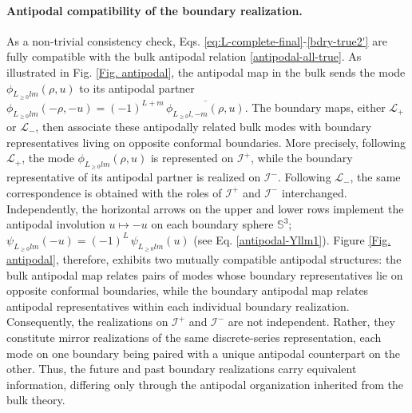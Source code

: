 \documentclass[aps,twocolumn,nofootinbib]{revtex4}
\begin{document}
{\paragraph{Antipodal compatibility of the boundary realization.} As a non-trivial consistency check, Eqs. \eqref{eq:L-complete-final}-\eqref{bdry-true2'} are fully compatible with the bulk antipodal relation \eqref{antipodal-all-true}. As illustrated in Fig. \ref{Fig. antipodal}, the antipodal map in the bulk sends the mode $\phi^{}_{L_{\geqslant 0}lm}(\rho,u)$ to its antipodal partner $\phi^{}_{L_{\geqslant 0}lm}(-\rho,-u) = (-1)^{L+m}\, \overline{\phi^{}_{L_{\geqslant 0}l,-m}(\rho,u)}$. The boundary maps, either ${\mathcal L}_+$ or ${\mathcal L}_-$, then associate these antipodally related bulk modes with boundary representatives living on opposite conformal boundaries. More precisely, following ${\mathcal L}_+$, the mode $\phi^{}_{L_{\geqslant 0}lm}(\rho,u)$ is represented on ${{\mathcal{I}}}^+$, while the boundary representative of its antipodal partner is realized on ${{\mathcal{I}}}^-$. Following ${\mathcal L}_-$, the same correspondence is obtained with the roles of ${{\mathcal{I}}}^+$ and ${{\mathcal{I}}}^-$ interchanged. Independently, the horizontal arrows on the upper and lower rows implement the antipodal involution $u\longmapsto -u$ on each boundary sphere ${{\mathbb{S}}}^3$; $\psi^{}_{L^{}_{\geqslant 0} lm} (-u) = (-1)^L \,\psi^{}_{L^{}_{\geqslant 0} lm} (u)$ (see Eq. \eqref{antipodal-Yllm1}). Figure \ref{Fig. antipodal}, therefore, exhibits two mutually compatible antipodal structures: the bulk antipodal map relates pairs of modes whose boundary representatives lie on opposite conformal boundaries, while the boundary antipodal map relates antipodal representatives within each individual boundary realization. Consequently, the realizations on ${{\mathcal{I}}}^+$ and ${{\mathcal{I}}}^-$ are not independent. Rather, they constitute mirror realizations of the same discrete-series representation, each mode on one boundary being paired with a unique antipodal counterpart on the other. Thus, the future and past boundary realizations carry equivalent information, differing only through the antipodal organization inherited from the bulk theory.

\begin{figure}[h]
    \begin{center}
    \begin{tikzpicture}[scale=0.97,
        arr/.style ={latex-latex, thick, line width=1pt},
        sarr/.style={-latex, thick, line width=1pt},
        lbl/.style ={font=\scriptsize, fill=white, inner sep=2pt},]
 

\end{tikzpicture}
\end{center}
\end{figure}}
\end{document}
